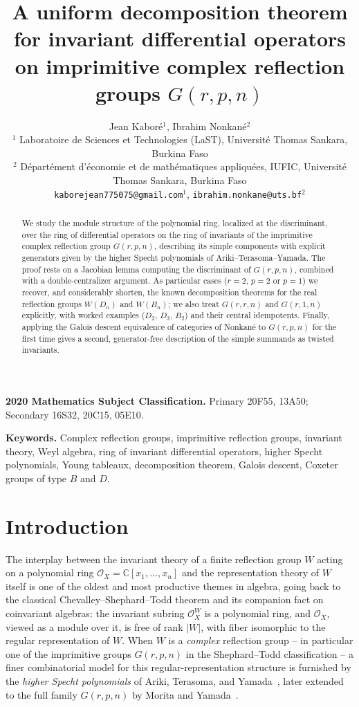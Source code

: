 \documentclass[11pt,a4paper]{article}
\title{A uniform decomposition theorem for invariant differential operators on imprimitive complex reflection groups $G(r,p,n)$}
\author{Jean Kabor\'e$^1$, Ibrahim Nonkan\'e$^2$\\[4pt]
\small $^1$ Laboratoire de Sciences et Technologies (LaST),
Universit\'e Thomas Sankara, Burkina Faso\\
\small $^2$ D\'epart\'ement d'\'economie et de math\'ematiques appliqu\'ees, IUFIC,
Universit\'e Thomas Sankara, Burkina Faso\\[4pt]
\small \texttt{kaborejean775075@gmail.com}$^1$, \texttt{ibrahim.nonkane@uts.bf}$^2$}
\date{}
\begin{document}
\maketitle

\begin{abstract}
{We study the module structure of the polynomial ring,
localized at the discriminant, over the ring of differential
operators on the ring of invariants of the imprimitive complex
reflection group $G(r,p,n)$, describing its simple components with
explicit generators given by the higher Specht polynomials of
Ariki--Terasoma--Yamada. The proof rests on a Jacobian lemma computing
the discriminant of $G(r,p,n)$, combined with a double-centralizer
argument. As particular cases ($r=2$, $p=2$ or $p=1$) we recover, and
considerably shorten, the known decomposition theorems for the real
reflection groups $W(D_n)$ and $W(B_n)$; we also treat $G(r,r,n)$ and
$G(r,1,n)$ explicitly, with worked examples ($D_2$, $D_3$, $B_2$) and
their central idempotents. Finally, applying the Galois descent equivalence of categories of
Nonkan\'e to $G(r,p,n)$ for the first time
gives a second, generator-free description of
the simple summands as twisted invariants.}
\end{abstract}

\noindent\textbf{2020 Mathematics Subject Classification.}
Primary 20F55, 13A50; Secondary 16S32, 20C15, 05E10.

\noindent\textbf{Keywords.} Complex reflection groups, imprimitive
reflection groups, invariant theory, Weyl algebra, ring of invariant
differential operators, higher Specht polynomials, Young tableaux,
decomposition theorem, Galois descent, Coxeter groups of type $B$
and $D$.

\section{Introduction}\label{sec:intro}

The interplay between the invariant theory of a finite reflection
group $W$ acting on a polynomial ring
$\mathcal{O}_X = \mathbb{C}[x_1,\dots,x_n]$ and the representation
theory of $W$ itself is one of the oldest and most productive themes
in algebra, going back to the classical Chevalley--Shephard--Todd
theorem and its companion fact on coinvariant algebras: the invariant
subring $\mathcal{O}_X^W$ is a polynomial ring, and $\mathcal{O}_X$,
viewed as a module over it, is free of rank $|W|$, with fiber
isomorphic to the regular representation of $W$. When $W$ is a
\emph{complex} reflection group -- in particular one of the
imprimitive groups $G(r,p,n)$ in the Shephard--Todd classification --
a finer combinatorial model for this regular-representation structure
is furnished by the \emph{higher Specht polynomials} of Ariki,
Terasoma, and Yamada~\cite{ATY1997}, later extended to the full
family $G(r,p,n)$ by Morita and Yamada~\cite{MoritaYamada1998}.
\end{document}
